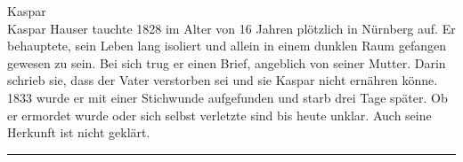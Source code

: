 Kaspar\\[+0.2em]
Kaspar Hauser tauchte 1828 im Alter von 16 Jahren plötzlich in Nürnberg auf. Er behauptete, sein Leben lang isoliert und allein in einem dunklen Raum gefangen gewesen zu sein. Bei sich trug er einen Brief, angeblich von seiner Mutter. Darin schrieb sie, dass der Vater verstorben sei und sie Kaspar nicht ernähren könne.
1833 wurde er mit einer Stichwunde aufgefunden und starb drei Tage später. Ob er ermordet wurde oder sich selbst verletzte sind bis heute unklar. Auch seine Herkunft ist nicht geklärt.\\
\noindent\rule{\textwidth}{0.3pt}\vspace{0.5em}